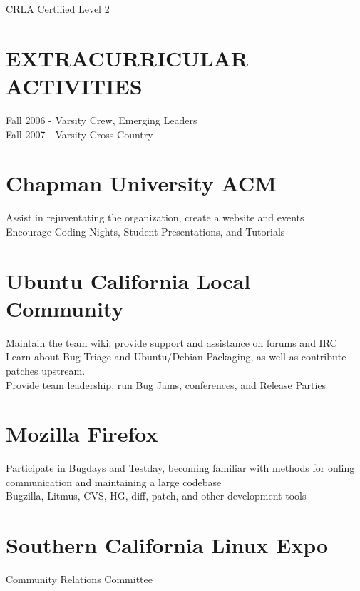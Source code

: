 \documentclass{res}
\begin{document}
\begin{resume}
	 CRLA Certified Level 2\\

 
\section{EXTRACURRICULAR ACTIVITIES}          
	 Fall 2006 - Varsity Crew, Emerging Leaders\\
	 Fall 2007 - Varsity Cross Country\\
\section{Chapman University ACM}
	 Assist in rejuventating the organization, create a website and events\\
	 Encourage Coding Nights, Student Presentations, and Tutorials\\
\section{Ubuntu California Local Community}
	 Maintain the team wiki, provide support and assistance on forums and IRC\\
	 Learn about Bug Triage and Ubuntu/Debian Packaging, as well as contribute patches upstream.\\
	 Provide team leadership, run Bug Jams, conferences, and Release Parties\\
\section{Mozilla Firefox}
	 Participate in Bugdays and Testday, becoming familiar with methods for onling communication and maintaining a large codebase\\
	 Bugzilla, Litmus, CVS, HG, diff, patch, and other development tools\\
\section{Southern California Linux Expo}
	 Community Relations Committee\\
 
\end{resume}
\end{document}

